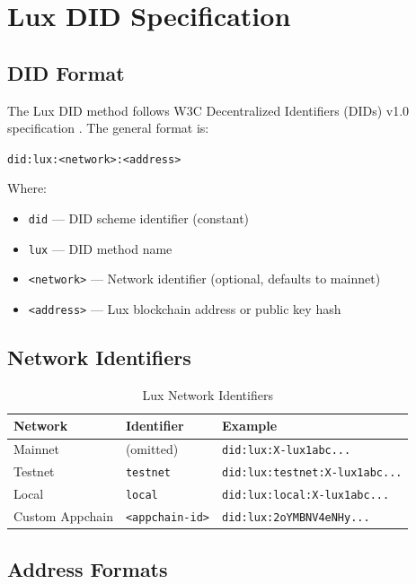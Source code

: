 \section{Lux DID Specification}


\subsection{DID Format}

The Lux DID method follows W3C Decentralized Identifiers (DIDs) v1.0 specification \cite{did-core}. The general format is:

\begin{center}
\texttt{did:lux:<network>:<address>}
\end{center}

Where:
\begin{itemize}
  \item \texttt{did} — DID scheme identifier (constant)
  \item \texttt{lux} — DID method name
  \item \texttt{<network>} — Network identifier (optional, defaults to mainnet)
  \item \texttt{<address>} — Lux blockchain address or public key hash
\end{itemize}

\subsection{Network Identifiers}

\begin{table}[h]
\centering
\begin{tabular}{@{}lll@{}}
\toprule
\textbf{Network} & \textbf{Identifier} & \textbf{Example} \\ \midrule
Mainnet & (omitted) & \texttt{did:lux:X-lux1abc...} \\
Testnet & \texttt{testnet} & \texttt{did:lux:testnet:X-lux1abc...} \\
Local & \texttt{local} & \texttt{did:lux:local:X-lux1abc...} \\
Custom Appchain & \texttt{<appchain-id>} & \texttt{did:lux:2oYMBNV4eNHy...} \\ \bottomrule
\end{tabular}
\caption{Lux Network Identifiers}
\end{table}

\subsection{Address Formats}

